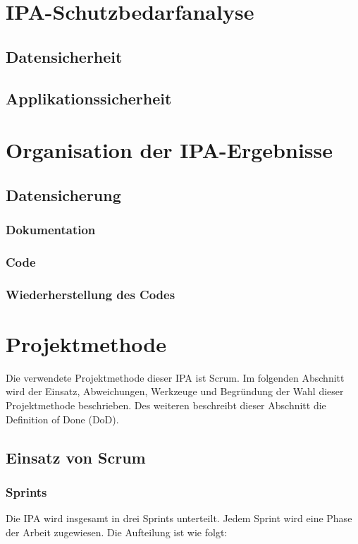 \chapter{IPA-Schutzbedarfanalyse}

\section{Datensicherheit}

\section{Applikationssicherheit}

\chapter{Organisation der IPA-Ergebnisse}

\section{Datensicherung}

\subsection{Dokumentation}

\subsection{Code}

\subsection{Wiederherstellung des Codes}

\chapter{Projektmethode}
Die verwendete Projektmethode dieser IPA ist Scrum. Im folgenden Abschnitt wird der Einsatz, Abweichungen, Werkzeuge und Begründung der Wahl
dieser Projektmethode beschrieben. Des weiteren beschreibt dieser Abschnitt die Definition of Done (DoD).

\section{Einsatz von Scrum}

\subsection{Sprints}
Die IPA wird insgesamt in drei Sprints unterteilt. Jedem Sprint wird eine Phase der Arbeit zugewiesen. Die Aufteilung ist wie folgt:

